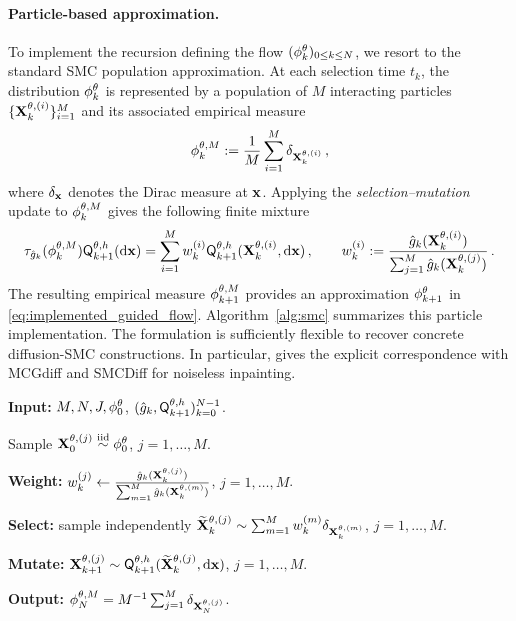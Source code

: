 \documentclass[11pt]{article}
\theoremstyle{plain}
\theoremstyle{definition}
\theoremstyle{remark}
\begin{document}
\paragraph{Particle-based approximation.}
To implement the recursion defining the flow $(\approxfilter{k})_{0\le k\le N}$, we resort to the standard SMC population approximation. At each selection time $t_k$, the distribution $\approxfilter{k}$ is represented by a population of $M$ interacting particles $\{\mathbf{X}_k^{\theta,(i)}\}_{i=1}^M$ and its associated empirical measure
$$
\mcfilter{k} \eqdef \frac{1}{M} \sum_{i=1}^{M} \delta_{\X_k^{\theta,(i)}} \eqsp,
$$
where $\delta_{\mathbf{x}}$ denotes the Dirac measure at $\mathbf{x} $. Applying the \textit{selection--mutation} update to $\mcfilter{k}$ gives the following
finite mixture
\begin{equation}
\label{eq:particle_predictive_mixture}
\tau_{\approxpot{k}}(\mcfilter{k}) \mk{k+1}[\theta,h](\rmd \x) = \sum_{i=1}^M w_k^{(i)} \mk{k+1}[\theta,h] (\X_k^{\theta,(i)},\rmd \x) \eqsp, \qquad
w_k^{(i)} \eqdef \frac{\approxpot{k}(\X_k^{\theta,(i)})} {\sum_{j=1}^M\approxpot{k}(\X_k^{\theta,(j)})} \eqsp.
\end{equation}
The resulting empirical measure $\mcfilter{k+1}$ provides an approximation $\approxfilter{k+1}$ in \eqref{eq:implemented_guided_flow}. Algorithm~\ref{alg:smc} summarizes this particle implementation. The formulation is sufficiently flexible to recover concrete diffusion-SMC constructions. In particular,  gives the explicit correspondence with MCGdiff \citep{cardoso2024monte} and SMCDiff \citep{trippe2023diffusion} for noiseless inpainting.

%
\begin{algorithm}[t]
\caption{Diffusion-based SMC with multinomial resampling}
\label{alg:smc}
\begin{algorithmic}[1]
\State \textbf{Input:} $M,N,J,\approxfilter{0}$,
$(\approxpot{k},\mk{k+1}[\theta,h])_{k=0}^{N-1}$.

\State Sample $\X_0^{\theta,(j)}
\stackrel{\mathrm{iid}}{\sim}\approxfilter{0}$,
$j=1,\ldots,M$.

    \State \textbf{Weight:}
    $w_k^{(j)}\gets
    \frac{\approxpot{k}(\X_k^{\theta,(j)})}
    {\sum_{m=1}^M\approxpot{k}(\X_k^{\theta,(m)})}$,
    $j=1,\ldots,M$.

    \State \textbf{Select:} sample independently \quad
    $\widetilde{\mathbf{X}}_k^{\theta,(j)}\sim
    \sum_{m=1}^M w_k^{(m)}\delta_{\mathbf{X}_k^{\theta,(m)}}$,
    $j=1,\ldots,M$.

    \State \textbf{Mutate:}
    $\X_{k+1}^{\theta,(j)}\sim
    \mk{k+1}[\theta,h](\widetilde\X_k^{\theta,(j)},\rmd\x)$,
    $j=1,\ldots,M$.
\EndFor

\State \textbf{Output:}
$\mcfilter{N}=M^{-1}\sum_{j=1}^M\delta_{\X_N^{\theta,(j)}}$.
\end{algorithmic}
\end{algorithm}
\end{document}
